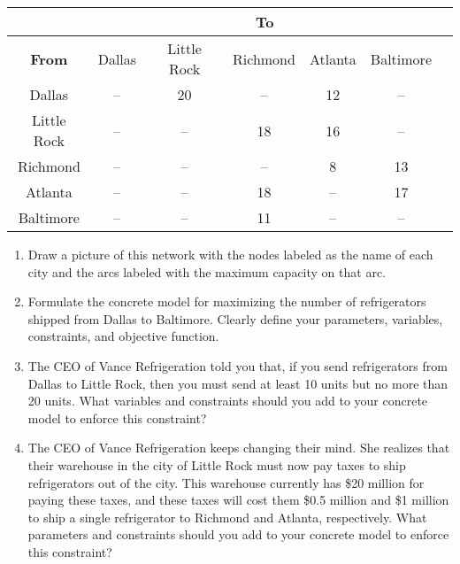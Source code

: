 \documentclass{article}
\begin{document}
\begin{enumerate}
\begin{center}
\begin{tabular}{ |c|c|c|c|c|c|c| } 
    \hline
    & \multicolumn{5}{c|}{ \textbf{To} }\\
    \hline
    \textbf{From} & Dallas & Little Rock & Richmond & Atlanta & Baltimore \\ 
    \hline
    Dallas  & --  & 20 & -- & 12 & --  \\ 
    \hline
    Little Rock & -- & --  & 18 & 16 &-- \\ 
    \hline
    Richmond & -- &  -- & -- & 8 & 13    \\ 
    \hline
    Atlanta &  -- & -- & 18 & --  & 17 \\ 
    \hline
    Baltimore & --  &  -- &  11 &--  &--   \\ 
    \hline
\end{tabular}
\end{center}


\begin{enumerate}

\item Draw a picture of this network with the nodes labeled as the name of each city and the arcs labeled with the maximum capacity on that arc.

\newpage

\item Formulate the concrete model for maximizing the number of refrigerators shipped from Dallas to Baltimore. Clearly define your parameters, variables, constraints, and objective function.
\newpage

\item The CEO of Vance Refrigeration told you that, if you send refrigerators from Dallas to Little Rock, then you must send at least 10 units but no more than 20 units. What variables and constraints should you add to your concrete model to enforce this constraint?
\vspace{7cm}
\item The CEO of Vance Refrigeration keeps changing their mind. She realizes that their warehouse in the city of Little Rock must now pay taxes to ship refrigerators out of the city. This warehouse currently has \$20 million for paying these taxes, and these taxes will cost them \$0.5 million and \$1 million to ship a single refrigerator to Richmond and Atlanta, respectively. What parameters and constraints should you add to your concrete model to enforce this constraint?
\end{enumerate}



\end{enumerate}
\end{document}
